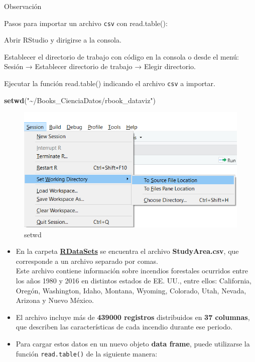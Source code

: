 \documentclass[
]{book}
\newenvironment{Shaded}{\begin{snugshade}}{\end{snugshade}}
\newcommand{\FunctionTok}[1]{\textcolor[rgb]{0.13,0.29,0.53}{\textbf{#1}}}
\newcommand{\NormalTok}[1]{#1}
\newcommand{\StringTok}[1]{\textcolor[rgb]{0.31,0.60,0.02}{#1}}
\begin{document}
{} Observación

Pasos para importar un archivo \texttt{csv} con read.table():

Abrir RStudio y dirigirse a la consola.

Establecer el directorio de trabajo con código en la consola o desde el menú:
Sesión → Establecer directorio de trabajo → Elegir directorio.

Ejecutar la función read.table() indicando el archivo \texttt{csv} a importar.

\begin{Shaded}
\begin{Highlighting}[]
\FunctionTok{setwd}\NormalTok{(}\StringTok{"\textasciitilde{}/Books\_CienciaDatos/rbook\_dataviz"}\NormalTok{)}
\end{Highlighting}
\end{Shaded}

\begin{figure}

{\centering \includegraphics[width=0.7\linewidth]{images/setwd} 

}

\caption{setwd}\label{fig:fig-2}
\end{figure}

\begin{itemize}
\item
  En la carpeta \textbf{\href{https://github.com/cdeoroaguado/Datos/blob/main/datarstudio/RDataSets.zip}{RDataSets}} se encuentra el archivo \textbf{StudyArea.csv}, que corresponde a un archivo separado por comas.\\
  Este archivo contiene información sobre incendios forestales ocurridos entre los años 1980 y 2016 en distintos estados de EE. UU., entre ellos: California, Oregón, Washington, Idaho, Montana, Wyoming, Colorado, Utah, Nevada, Arizona y Nuevo México.
\item
  El archivo incluye más de \textbf{439000 registros} distribuidos en \textbf{37 columnas}, que describen las características de cada incendio durante ese periodo.
\item
  Para cargar estos datos en un nuevo objeto \textbf{data frame}, puede utilizarse la función \texttt{read.table()} de la siguiente manera:
\end{itemize}
\end{document}
